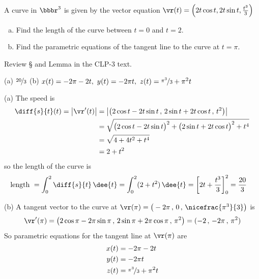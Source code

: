 \begin{question}[M317 2011D] %
A curve in $\bbbr^3$ is given by the vector equation 
$\vr(t) = \left(2t \cos t, 2t \sin t,\frac{t^3}{3}\right)$

\begin{enumerate}[(a)]
\item
Find the length of the curve between $t = 0$ and $t = 2$.

\item
Find the parametric equations of the tangent line to the curve at $t = \pi$.

\end{enumerate}
\end{question}

\begin{hint} 
Review \S{} and  Lemma  
in the CLP-3 text.
\end{hint}

\begin{answer} 
(a) $\nicefrac{20}{3}$\qquad
(b) $x(t) = -2\pi -2t,\ 
     y(t) =  -2\pi t,\ 
     z(t) = \nicefrac{\pi^3}{3} + \pi^2 t$ 
\end{answer}

\begin{solution} (a) The speed is
\begin{align*}
\diff{s}{t}(t)
=\big|\vr'(t)\big| & = \left|\left(2\cos t - 2t\sin t\,,\,
                                  2\sin t + 2t \cos t\,,\,
                                  t^2\right)\right| \\
                  &=\sqrt{\big(2\cos t - 2t\sin t\big)^2
                         +\big(2\sin t + 2t \cos t\big)^2
                         +t^4} \\
                 &= \sqrt{4+ 4t^2 +t^4} \\
                 &= 2+t^2
\end{align*}
so the length of the curve is
\begin{align*}
\text{length }
&=\int_0^2 \diff{s}{t}\,\dee{t}
  =\int_0^2 (2+t^2)\,\dee{t}
  = \left[2t +\frac{t^3}{3}\right]_0^2
  =\frac{20}{3}
\end{align*}

\noindent (b)
A tangent vector to the curve at 
$\vr(\pi)=\big(-2\pi\,,\, 0\,,\, \nicefrac{\pi^3}{3}\big)$ is
\begin{equation*}
\vr'(\pi) = \left(2\cos\pi - 2\pi\sin\pi\,,\,
                                  2\sin\pi + 2\pi \cos\pi\,,\,
                                  \pi^2\right)
 = (-2\,,\,-2\pi\,,\,\pi^2)
\end{equation*}
So parametric equations for the tangent line at $\vr(\pi)$ are
\begin{align*}
x(t) &= -2\pi -2t \\
y(t) &=  -2\pi t \\
z(t) &= \nicefrac{\pi^3}{3} + \pi^2 t 
\end{align*}
\end{solution}

